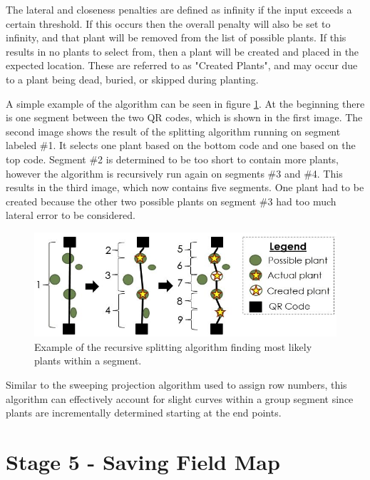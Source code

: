 The lateral and closeness penalties are defined as infinity if the input exceeds a certain threshold.  If this occurs then the overall penalty will also be set to infinity, and that plant will be removed from the list of possible plants.  If this results in no plants to select from, then a plant will be created and placed in the expected location.  These are referred to as "Created Plants", and may occur due to a plant being dead, buried, or skipped during planting.  

A simple example of the algorithm can be seen in figure \ref{figure:recursive_algorithm}.  At the beginning there is one segment between the two QR codes, which is shown in the first image.  The second image shows the result of the splitting algorithm running on segment labeled \#1. It selects one plant based on the bottom code and one based on the top code.  Segment \#2 is determined to be too short to contain more plants, however the algorithm is recursively run again on segments \#3 and \#4.  This results in the third image, which now contains five segments.  One plant had to be created because the other two possible plants on segment \#3 had too much lateral error to be considered.   

\begin{figure}
	\centering
    \includegraphics[width=5in]{figures/recursive_algorithm2.jpg}
    \caption[Recursive splitting algorithm]{Example of the recursive splitting algorithm finding most likely plants within a segment.}
    \label{figure:recursive_algorithm}
\end{figure}

Similar to the sweeping projection algorithm used to assign row numbers, this algorithm can effectively account for slight curves within a group segment since plants are incrementally determined starting at the end points. 

\section{Stage 5 - Saving Field Map}
\label{processing-stage5}

